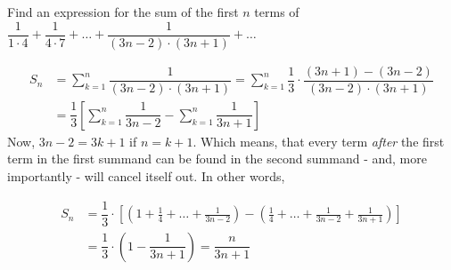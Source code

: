 
%
%
%
%
% 
% 

\question[3] Find an expression for the sum of the first $n$ terms of 
$\dfrac{1}{1\cdot 4} + \dfrac{1}{4\cdot 7} + \ldots + \dfrac{1}{(3n-2)\cdot(3n+1)} + \ldots$


\ifprintanswers
\fi 

\begin{solution}[\halfpage]
	\begin{align}
		S_n &= \sum_{k=1}^{n}\dfrac{1}{(3n-2)\cdot(3n+1)} = 
		\sum_{k=1}^{n}\dfrac{1}{3}\cdot\dfrac{(3n+1) - (3n-2)}{(3n-2)\cdot(3n+1)} \\
		&= \dfrac{1}{3}\left[ \sum_{k=1}^{n}\dfrac{1}{3n-2} - \sum_{k=1}^{n}\dfrac{1}{3n+1}\right]
	\end{align}
	Now, $3n-2 = 3k + 1$ if $n = k + 1$. Which means, that every term \textit{after} the first
	term in the first summand can be found in the second summand - and, more importantly - will 
	cancel itself out. In other words,
	
	\begin{align}
		S_n &= \dfrac{1}{3}\cdot\left[\left( 1+\frac{1}{4}+\ldots +\frac{1}{3n-2}\right)
		- \left( \frac{1}{4} + \ldots + \frac{1}{3n-2} + \frac{1}{3n+1}\right) \right] \\
		&= \dfrac{1}{3}\cdot\left( 1-\dfrac{1}{3n+1}\right) = \dfrac{n}{3n+1}
	\end{align}
\end{solution}
